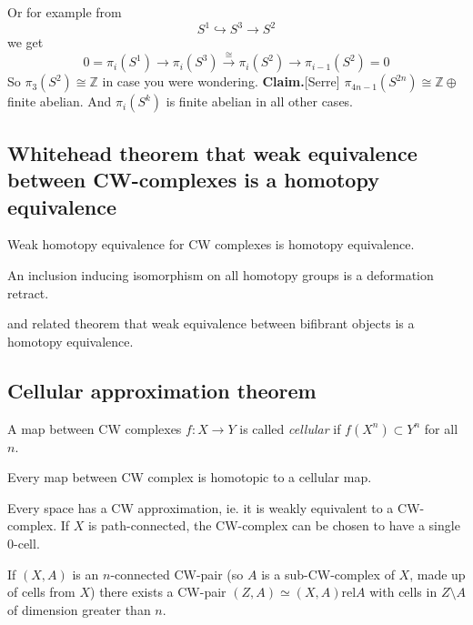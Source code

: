 Or for example from
$$S^1\hookrightarrow S^3\to S^2$$
we get
$$0=\pi_i(S^1)\to
\pi_i(S^3)\overset{\cong}{\to}\pi_i(S^2)
\to\pi_{i-1}(S^2)=0$$
So $\pi_3(S^2)\cong\mathbb{Z}$ in case you
were wondering.
{\bf Claim.}[Serre]
	$\pi_{4n-1}(S^{2n})\cong\mathbb{Z}
	\oplus$finite
	abelian. And $\pi_i(S^k)$ is finite abelian
	in all other cases.

\subsection{Whitehead theorem that weak
equivalence between CW-complexes is a
homotopy equivalence}
\label{subsection-white-theor-weak-equiv}

\begin{theorem}[Whitehead]
\label{theorem-whitehead}
	Weak homotopy equivalence for CW complexes
	is homotopy equivalence.

	An inclusion inducing isomorphism on all
	homotopy groups is a deformation retract.
\end{theorem}


and related theorem that weak equivalence
between bifibrant objects is a homotopy
equivalence.
\subsection{Cellular approximation theorem}
\label{subsection-celul-appro-theor}

\begin{definition}
\label{definition-cellular-map}
	A map between CW complexes $f:X\to Y$ is
	called {\it cellular} if $f(X^{n})\subset
	Y^{n}$ for all $n$.
\end{definition}
\begin{theorem}
\label{theorem-every-map-betwe-cw-compl}
	Every map between CW complex is homotopic to
	a cellular map.
\end{theorem}
\begin{theorem}[CW approximation]
\label{theorem-cw-approximation}
	Every space has a CW approximation, ie. it
	is weakly equivalent to a CW-complex.
	If $X$ is path-connected, the CW-complex can
	be chosen to have a single 0-cell.

	If $(X,A)$ is an $n$-connected CW-pair (so
	$A$ is a sub-CW-complex of $X$, made up of
	cells from $X$) there exists a CW-pair
	$(Z,A)\simeq (X,A)\text{rel}A$ with cells in
	$Z\setminus A$ of dimension greater than
	$n$.
\end{theorem}


